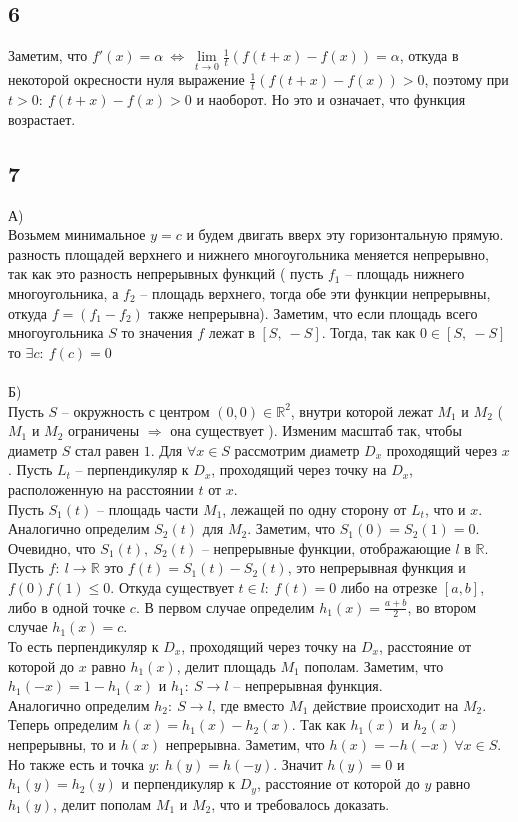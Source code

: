 		\subsection{6}
		Заметим, что $f'(x) = \alpha \ \Leftrightarrow \ \lim\limits_{t \to 0} \frac{1}{t} (f(t+x) - f(x)) = \alpha$, откуда в некоторой окресности нуля выражение $\frac{1}{t} (f(t+x) - f(x)) > 0$, поэтому при $t > 0:\ f(t+x) - f(x) > 0$ и наоборот. Но это и означает, что функция возрастает.
		
		\subsection{7}
		А)\\
		Возьмем минимальное $y = c$ и будем двигать вверх эту горизонтальную прямую. разность площадей верхнего и нижнего многоугольника меняется непрерывно, так как это разность непрерывных функций ( пусть $f_1$ -- площадь нижнего многоугольника, а $f_2$ -- площадь верхнего, тогда обе эти функции непрерывны, откуда $f = (f_1 - f_2)$ также непрерывна). Заметим, что если площадь всего многоугольника $S$ то значения $f$ лежат в $[S,\ -S]$. Тогда, так как $0 \in [S,\ -S]$ то $\exists c:\ f(c) = 0$\\
		\\
		Б)\\
		Пусть $S$ -- окружность с центром $(0,0) \in \mathbb{R}^2$, внутри которой лежат $M_1$ и $M_2$ ( $M_1$ и $M_2$ ограничены $\Rightarrow$ она существует ). Изменим масштаб так, чтобы диаметр $S$ стал равен $1$. Для $\forall x\in S$ рассмотрим диаметр $D_x$ проходящий через $x$. Пусть $L_t$ -- перпендикуляр к $D_x$, проходящий через точку на $D_x$, расположенную на расстоянии $t$ от $x$.\\
		Пусть $S_1(t)$ -- площадь части $M_1$, лежащей по одну сторону от $L_t$, что и $x$. Аналогично определим $S_2(t)$ для $M_2$. Заметим, что $S_1(0) = S_2(1) = 0$. Очевидно, что $S_1(t),\ S_2(t)$ -- непрерывные функции, отображающие $l$ в $\mathbb{R}$. Пусть $f:\ l \to \mathbb{R}$ это $f(t) = S_1(t) - S_2(t)$, это непрерывная функция и $f(0)f(1) \leqslant 0$. Откуда существует $t \in l:\ f(t)=0$ либо на отрезке $[a,b]$, либо в одной точке $c$. В первом случае определим $h_1(x) = \frac{a+b}{2}$, во втором случае $h_1(x) = c$.\\
		То есть перпендикуляр к $D_x$, проходящий через точку на $D_x$, расстояние от которой до $x$ равно $h_1(x)$, делит площадь $M_1$ пополам. Заметим, что $h_1(-x) = 1-h_1(x)$ и $h_1:\ S \to l$ -- непрерывная функция.\\
		Аналогично определим $h_2:\ S \to l$, где вместо $M_1$ действие происходит на $M_2$.\\
		Теперь определим $h(x)= h_1(x) - h_2(x)$. Так как $h_1(x)$ и $h_2(x)$ непрерывны, то и $h(x)$ непрерывна. Заметим, что $h(x) = -h(-x)\ \forall x\in S$. Но также есть и точка $y:\ h(y) = h(-y)$. Значит $h(y) = 0$ и $h_1(y) = h_2(y)$ и перпендикуляр к $D_y$, расстояние от которой до $y$ равно $h_1(y)$, делит пополам $M_1$ и $M_2$, что и требовалось доказать.
		\\
		
